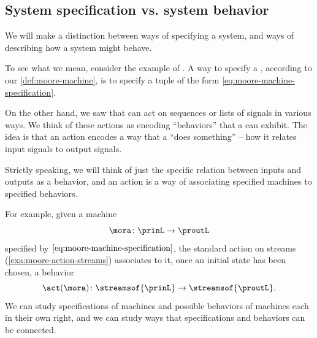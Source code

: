 
\subsection{System specification vs. system behavior}

We will make a distinction between ways of specifying a system, and ways of describing how a system might behave.

To see what we mean, consider the example of .
A way to specify a , according to our \cref{def:moore-machine}, is to specify a tuple of the form \cref{eq:moore-machine-specification}.

On the other hand, we saw that  can act on sequences or lists of signals in various ways.
We think of these actions as encoding ``behaviors'' that a  can exhibit.
The idea is that an action encodes a way that a  ``does something'' -- how it relates input signals to output signals.

Strictly speaking, we will think of just the specific relation between inputs and outputs as a behavior, and an action is a way of associating specified machines to specified behaviors.


For example, given a machine
\begin{equation}
    \mora \colon \prinL \to \proutL
\end{equation}
specified by $\cref{eq:moore-machine-specification}$, the standard action on streams (\cref{exa:moore-action-streams}) associates to it, once an initial state has been chosen, a behavior
\begin{equation}
    \act(\mora) \colon \streamsof{\prinL} \to \streamsof{\proutL}.
\end{equation}
We can study specifications of machines and possible behaviors of machines each in their own right, and we can study ways that specifications and behaviors can be connected.





